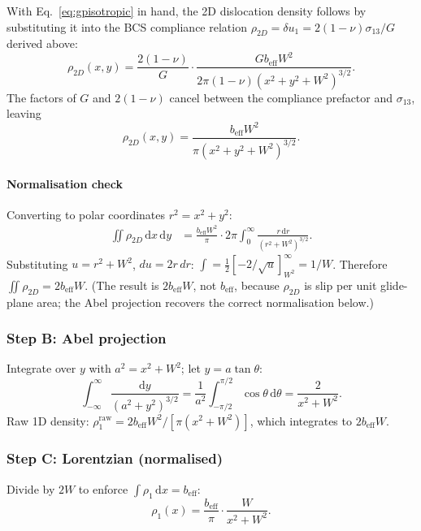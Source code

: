 \documentclass[3p]{elsarticle}
\newcommand{\beff}{b_\mathrm{eff}}
\newcommand{\half}{\tfrac{1}{2}}
\begin{document}
With Eq.~\eqref{eq:gpisotropic} in hand, the 2D dislocation density
follows by substituting it into the BCS compliance relation
$\rho_{2D}=\delta u_1=2(1-\nu)\sigma_{13}/G$ derived above:
\begin{equation}
  \rho_{2D}(x,y)=\frac{2(1-\nu)}{G}\cdot
  \frac{G\beff W^2}{2\pi(1-\nu)(x^2+y^2+W^2)^{3/2}}.
  \label{eq:rho2Dsub}
\end{equation}
The factors of $G$ and $2(1-\nu)$ cancel between the compliance
prefactor and $\sigma_{13}$, leaving
\begin{equation}
  \rho_{2D}(x,y)=\frac{\beff W^2}{\pi(x^2+y^2+W^2)^{3/2}}.
  \label{eq:rho2D}
\end{equation}

\paragraph{Normalisation check}
Converting to polar coordinates $r^2=x^2+y^2$:
\begin{align*}
  \iint\rho_{2D}\,\mathrm dx\,\mathrm dy
  &=\frac{\beff W^2}{\pi}\cdot2\pi
    \int_0^\infty\frac{r\,\mathrm dr}{(r^2+W^2)^{3/2}}.
\end{align*}
Substituting $u=r^2+W^2$, $du=2r\,dr$:
$\int=\half[-2/\sqrt{u}]_{W^2}^\infty=1/W$.
Therefore $\iint\rho_{2D}=2\beff W$.
(The result is $2\beff W$, not $\beff$, because $\rho_{2D}$ is slip
per unit glide-plane area; the Abel projection recovers the correct
normalisation below.)

\subsubsection{Step B: Abel projection}
\label{sec:stepB-abel}

Integrate over $y$ with $a^2=x^2+W^2$; let $y=a\tan\theta$:
\begin{equation}
  \int_{-\infty}^\infty\frac{\mathrm dy}{(a^2+y^2)^{3/2}}
  =\frac{1}{a^2}\!\int_{-\pi/2}^{\pi/2}\cos\theta\,\mathrm d\theta
  =\frac{2}{x^2+W^2}.
  \label{eq:abel}
\end{equation}
Raw 1D density: $\rho_1^\text{raw}=2\beff W^2/[\pi(x^2+W^2)]$,
which integrates to $2\beff W$.

\subsubsection{Step C: Lorentzian (normalised)}
\label{sec:stepC-lorentz}

Divide by $2W$ to enforce $\int\rho_1\,\mathrm dx=\beff$:
\begin{equation}
  \boxed{\rho_1(x)=\frac{\beff}{\pi}\cdot\frac{W}{x^2+W^2}.}
  \label{eq:rho1}
\end{equation}
\end{document}
